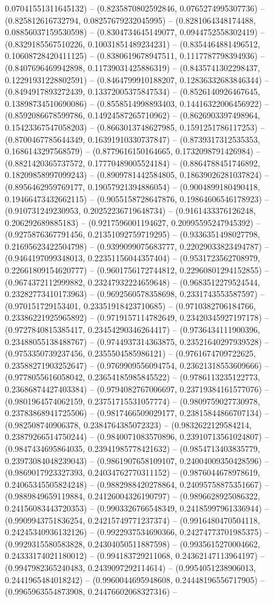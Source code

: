 0.07041551311645132) -- (0.8235870802592846, 0.0765274995307736) -- (0.825812616732794, 0.08257679232045995) -- (0.8281064348174488, 0.08856037159530598) -- (0.8304734645149077, 0.0944752558302419) -- (0.8329185567510226, 0.10031851489234231) -- (0.8354464881496512, 0.10608728420411125) -- (0.8380619678947511, 0.1117787798394936) -- (0.8407696469942898, 0.11739031425886319) -- (0.8435741302298437, 0.12291931228802591) -- (0.8464799910188207, 0.12836332683846344) -- (0.8494917893272439, 0.13372005375847534) -- (0.8526140926467645, 0.13898734510690086) -- (0.8558514998893403, 0.14416322006456922) -- (0.8592086678599786, 0.14924587265710962) -- (0.8626903397498964, 0.15423367547058203) -- (0.8663013748627985, 0.1591251786117253) -- (0.8700467785644349, 0.16391910330737847) -- (0.8739317312535353, 0.1686143297568579) -- (0.8779616150164665, 0.1732098791426984) -- (0.8821420365737572, 0.17770489005524184) -- (0.8864788451746892, 0.18209858997099243) -- (0.8909781442584805, 0.18639026281037824) -- (0.8956462959769177, 0.19057921394886054) -- (0.9004899180490418, 0.19466473432662115) -- (0.9055158728647876, 0.19864606546178923) -- (0.910731249230953, 0.20252236719648734) -- (0.9161433376126248, 0.206292689885183) -- (0.9217596001194627, 0.20995595247945392) -- (0.9275876367791456, 0.21351092759719295) -- (0.9336351498027798, 0.21695623422504798) -- (0.9399099075683777, 0.22029033823494787) -- (0.9464197099348013, 0.22351156044357404) -- (0.9531723562708979, 0.22661809154620777) -- (0.9601756172744812, 0.22960801294152855) -- (0.9674372112999882, 0.23247932224659648) -- (0.9683512279524544, 0.23282773410173963) -- (0.9692560578358698, 0.2331743553587597) -- (0.970151729153401, 0.23351918423710685) -- (0.9710382706184766, 0.23386221925965892) -- (0.9719157114782649, 0.23420345927197178) -- (0.9727840815385417, 0.23454290346264417) -- (0.9736434111900396, 0.23488055138488767) -- (0.9744937314363875, 0.23521640297939528) -- (0.9753350739237456, 0.2355504585986121) -- (0.9761674709722625, 0.23588271903252647) -- (0.9769909556094754, 0.23621318553609666) -- (0.9778055616058042, 0.23654185985845522) -- (0.9786113235122773, 0.23686874427403384) -- (0.9794082767006697, 0.23719384161577076) -- (0.9801964574062159, 0.23751715531057774) -- (0.9809759027730978, 0.23783868941725506) -- (0.9817466509029177, 0.23815844866707134) -- (0.982508740906378, 0.2384764385072323) -- (0.9832622129584214, 0.23879266514750244) -- (0.9840071083570896, 0.23910713561024807) -- (0.9847434695864035, 0.23941985778421632) -- (0.9854713403835779, 0.23973084048239043) -- (0.9861907658109107, 0.24004009350428596) -- (0.9869017923327393, 0.24034762770311152) -- (0.9876044678978619, 0.24065345505824248) -- (0.9882988420278864, 0.24095758875351667) -- (0.9889849659119884, 0.24126004326190797) -- (0.9896628925086322, 0.24156083443720353) -- (0.9903326766548349, 0.24185997961336944) -- (0.9909943751836254, 0.24215749771237374) -- (0.9916480470504118, 0.24245340936132126) -- (0.9922937534690366, 0.24274773701985375) -- (0.9929315580583828, 0.24304050511887598) -- (0.9935615270004662, 0.24333174021180012) -- (0.994183729211068, 0.24362147113964197) -- (0.9947982365240483, 0.2439097292114614) -- (0.9954051238906013, 0.2441965484018242) -- (0.9960044695948608, 0.24448196556717905) -- (0.9965963554873908, 0.24476602068327316) -- 